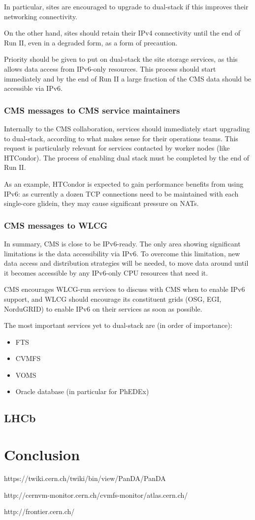 \documentclass[11pt]{article}
\begin{document}
In particular, sites are encouraged to upgrade to dual-stack if this
improves their networking connectivity.

On the other hand, sites should retain their IPv4 connectivity until
the end of Run II, even in a degraded form, as a form of precaution.

Priority should be given to put on dual-stack the site storage services, as
this allows data access from IPv6-only resources. This process should
start immediately and by the end of Run II a large fraction of the CMS
data should be accessible via IPv6.

\subsubsection{CMS messages to CMS service maintainers}
Internally to the CMS collaboration, services should immediately start
upgrading to dual-stack, according to what makes sense for their
operations teams. This request is particularly relevant for services
contacted by worker nodes (like HTCondor). The process of enabling
dual stack must be completed by the end of Run II.

As an example, HTCondor is expected to gain performance benefits from
using IPv6: as currently a dozen TCP connections need to be maintained
with each single-core glidein, they may cause significant pressure on
NATs. 

\subsubsection{CMS messages to WLCG}
In summary, CMS is close to be IPv6-ready. The only area showing
significant limitations is the data accessibility via IPv6. To
overcome this limitation, new data access and distribution strategies
will be needed, to move data around until it becomes accessible by any
IPv6-only CPU resources that need it.

CMS encourages WLCG-run services to discuss with CMS when to enable
IPv6 support, and WLCG should encourage its constituent grids (OSG,
EGI, NorduGRID) to enable IPv6 on their services as soon as possible.

The most important services yet to dual-stack are (in order of
importance):
\begin{itemize}
\item FTS
\item CVMFS
\item VOMS
\item Oracle database (in particular for PhEDEx)
\end{itemize}

\subsection{LHCb}


\section{Conclusion}


\begin{thebibliography}{99}

 https://twiki.cern.ch/twiki/bin/view/PanDA/PanDA

 http://cernvm-monitor.cern.ch/cvmfs-monitor/atlas.cern.ch/

 http://frontier.cern.ch/

\end{thebibliography}
\end{document}

